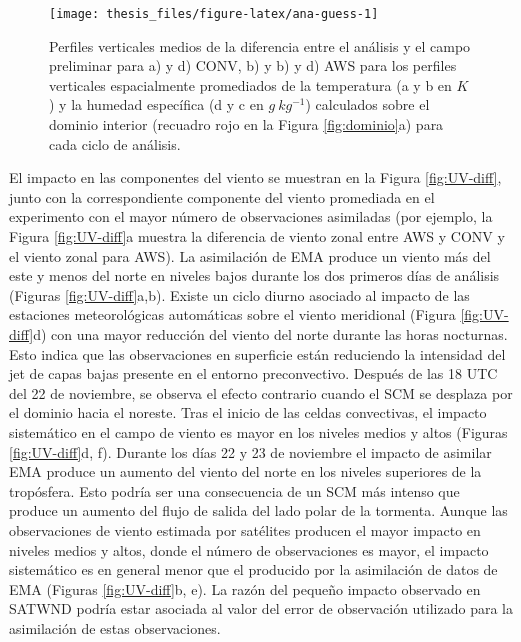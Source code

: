 \documentclass[12pt,oneside]{reedthesis}
\begin{document}
\begin{figure}

{\centering \texttt{[image: thesis\_files/figure-latex/ana-guess-1]} 

}

\caption{Perfiles verticales medios de la diferencia entre el análisis y el campo preliminar para a) y d) CONV, b) y b) y d) AWS para los perfiles verticales espacialmente promediados de la temperatura (a y b en \(K\)) y la humedad específica (d y c en \(g\ kg^{-1}\)) calculados sobre el dominio interior (recuadro rojo en la Figura \ref{fig:dominio}a) para cada ciclo de análisis.}\label{fig:ana-guess}
\end{figure}
El impacto en las componentes del viento se muestran en la Figura \ref{fig:UV-diff}, junto con la correspondiente componente del viento promediada en el experimento con el mayor número de observaciones asimiladas (por ejemplo, la Figura \ref{fig:UV-diff}a muestra la diferencia de viento zonal entre AWS y CONV y el viento zonal para AWS). La asimilación de EMA produce un viento más del este y menos del norte en niveles bajos durante los dos primeros días de análisis (Figuras \ref{fig:UV-diff}a,b). Existe un ciclo diurno asociado al impacto de las estaciones meteorológicas automáticas sobre el viento meridional (Figura \ref{fig:UV-diff}d) con una mayor reducción del viento del norte durante las horas nocturnas. Esto indica que las observaciones en superficie están reduciendo la intensidad del jet de capas bajas presente en el entorno preconvectivo. Después de las 18 UTC del 22 de noviembre, se observa el efecto contrario cuando el SCM se desplaza por el dominio hacia el noreste. Tras el inicio de las celdas convectivas, el impacto sistemático en el campo de viento es mayor en los niveles medios y altos (Figuras \ref{fig:UV-diff}d, f). Durante los días 22 y 23 de noviembre el impacto de asimilar EMA produce un aumento del viento del norte en los niveles superiores de la tropósfera. Esto podría ser una consecuencia de un SCM más intenso que produce un aumento del flujo de salida del lado polar de la tormenta. Aunque las observaciones de viento estimada por satélites producen el mayor impacto en niveles medios y altos, donde el número de observaciones es mayor, el impacto sistemático es en general menor que el producido por la asimilación de datos de EMA (Figuras \ref{fig:UV-diff}b, e). La razón del pequeño impacto observado en SATWND podría estar asociada al valor del error de observación utilizado para la asimilación de estas observaciones.
\end{document}
